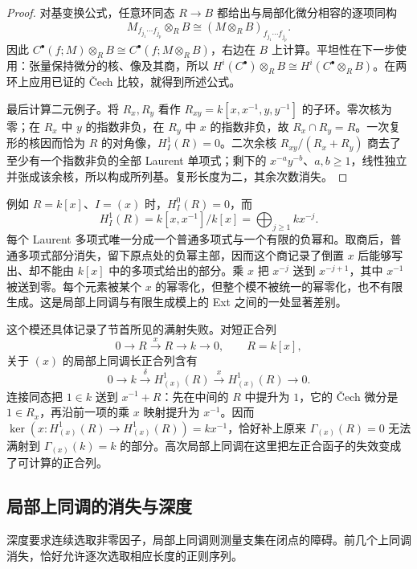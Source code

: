 \begin{proof}
	对基变换公式，任意环同态 \(R\to B\) 都给出与局部化微分相容的逐项同构
	\[
		M_{f_{j_1}\cdots f_{j_p}}\otimes_RB \cong(M\otimes_RB)_{f_{j_1}\cdots f_{j_p}}.
	\]
	因此 \(C^\bullet(f;M)\otimes_RB\cong C^\bullet(f;M\otimes_RB)\)，右边在 \(B\) 上计算。平坦性在下一步使用：张量保持微分的核、像及其商，所以 \(H^i(C^\bullet)\otimes_RB\cong H^i(C^\bullet\otimes_RB)\)。在两环上应用已证的 Čech 比较，就得到所述公式。

	最后计算二元例子。将 \(R_x,R_y\) 看作 \(R_{xy}=k[x,x^{-1},y,y^{-1}]\) 的子环。零次核为零；在 \(R_x\) 中 \(y\) 的指数非负，在 \(R_y\) 中 \(x\) 的指数非负，故 \(R_x\cap R_y=R\)。一次复形的核因而恰为 \(R\) 的对角像，\(H_I^1(R)=0\)。二次余核 \(R_{xy}/(R_x+R_y)\) 商去了至少有一个指数非负的全部 Laurent 单项式；剩下的 \(x^{-a}y^{-b}\)、\(a,b\ge1\)，线性独立并张成该余核，所以构成所列基。复形长度为二，其余次数消失。
\end{proof}

例如 \(R=k[x]\)、\(I=(x)\) 时，\(H_I^0(R)=0\)，而
\[
	H_I^1(R)=k[x,x^{-1}]/k[x] =\bigoplus_{j\ge1}k x^{-j}.
\]
每个 Laurent 多项式唯一分成一个普通多项式与一个有限的负幂和。取商后，普通多项式部分消失，留下原点处的负幂主部，因而这个商记录了倒置 \(x\) 后能够写出、却不能由 \(k[x]\) 中的多项式给出的部分。乘 \(x\) 把 \(x^{-j}\) 送到 \(x^{-j+1}\)，其中 \(x^{-1}\) 被送到零。每个元素被某个 \(x\) 的幂零化，但整个模不被统一的幂零化，也不有限生成。这是局部上同调与有限生成模上的 Ext 之间的一处显著差别。

\ProseParagraphBreak
这个模还具体记录了节首所见的满射失败。对短正合列
\[
	0\longrightarrow R\xrightarrow{x}R\longrightarrow k\longrightarrow0, \qquad R=k[x],
\]
关于 \((x)\) 的局部上同调长正合列含有
\[
	0\longrightarrow k\xrightarrow{\delta}H^1_{(x)}(R) \xrightarrow{x}H^1_{(x)}(R)\longrightarrow0.
\]
连接同态把 \(1\in k\) 送到 \(x^{-1}+R\)：先在中间的 \(R\) 中提升为 \(1\)，它的 Čech 微分是 \(1\in R_x\)，再沿前一项的乘 \(x\) 映射提升为 \(x^{-1}\)。因而 \(\ker(x:H^1_{(x)}(R)\to H^1_{(x)}(R))=k x^{-1}\)，恰好补上原来 \(\Gamma_{(x)}(R)=0\) 无法满射到 \(\Gamma_{(x)}(k)=k\) 的部分。高次局部上同调在这里把左正合函子的失效变成了可计算的正合列。

\subsection{局部上同调的消失与深度}
\label{b3:subsec:2201:03}

深度要求连续选取非零因子，局部上同调则测量支集在闭点的障碍。前几个上同调消失，恰好允许逐次选取相应长度的正则序列。

